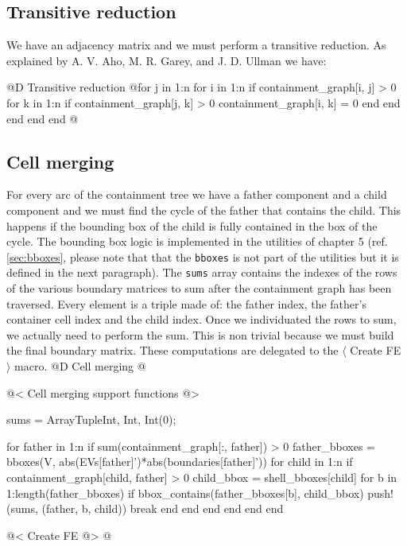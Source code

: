 \documentclass[10pt]{book}
\begin{document}
\subsection{Transitive reduction}

We have an adjacency matrix and we must perform a transitive reduction.
As explained by A. V. Aho, M. R. Garey, and J. D. Ullman \cite{parallel_transitive_reduction}
we have:

@D Transitive reduction
@{for j in 1:n
    for i in 1:n
        if containment_graph[i, j] > 0
            for k in 1:n
                if containment_graph[j, k] > 0
                    containment_graph[i, k] = 0
                end
            end
        end
    end
end
@}

\subsection{Cell merging}

For every arc of the containment tree we have a father component 
and a child component and we must find the cycle of the father that
contains the child. This happens if the bounding box of the child is fully
contained in the box of the cycle. The bounding box logic is implemented
in the utilities of chapter 5 (ref. \ref{sec:bboxes}, please note that
that the \texttt{bboxes} is not part of the utilities but it is defined 
in the next paragraph). The \texttt{sums} array contains the indexes of 
the rows of the various boundary matrices to sum after the containment 
graph has been traversed. Every element is a triple made of: the father 
index, the father's container cell index and the child index.
Once we individuated the rows to sum, we actually need to perform the sum.
This is non trivial because we must build the final boundary matrix.
These computations are delegated to the $\langle$ Create FE $\rangle$ macro.
@D Cell merging
@{@< Cell merging support functions @>

sums = Array{Tuple{Int, Int, Int}}(0);

for father in 1:n
    if sum(containment_graph[:, father]) > 0
        father_bboxes = bboxes(V, abs(EVs[father]')*abs(boundaries[father]'))
        for child in 1:n
            if containment_graph[child, father] > 0
                child_bbox = shell_bboxes[child]
                for b in 1:length(father_bboxes)
                    if bbox_contains(father_bboxes[b], child_bbox)
                        push!(sums, (father, b, child))
                        break
                    end
                end
            end            
        end
    end
end

@< Create FE @>
@}
\end{document}
